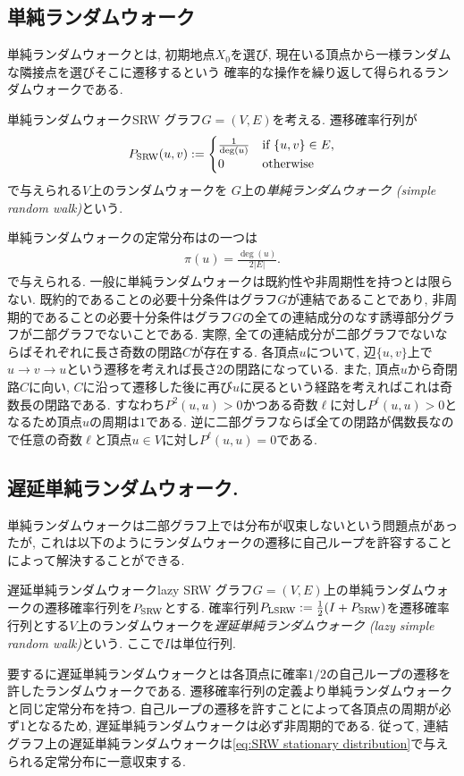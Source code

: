 \subsection{単純ランダムウォーク}
単純ランダムウォークとは, 初期地点$X_0$を選び, 現在いる頂点から一様ランダムな隣接点を選びそこに遷移するという
確率的な操作を繰り返して得られるランダムウォークである.
%
\begin{definition}{単純ランダムウォーク}{SRW}
  グラフ$G=(V,E)$を考える.
  遷移確率行列が
  \[
    P_{\mathrm{SRW}}(u,v) \mathrel{:=} \begin{cases}
      \frac{1}{\deg(u)} & \text{if }\{u,v\}\in E, \\
      0                 & \text{otherwise}
    \end{cases}
  \]
  で与えられる$V$上のランダムウォークを
  $G$上の\emph{単純ランダムウォーク (simple random walk)}という.
\end{definition}
%

単純ランダムウォークの定常分布はの一つは
\begin{align}
  \pi(u) = \frac{\deg(u)}{2|E|}. \label{eq:SRW stationary distribution}
\end{align}
で与えられる.
一般に単純ランダムウォークは既約性や非周期性を持つとは限らない.
既約的であることの必要十分条件はグラフ$G$が連結であることであり,
非周期的であることの必要十分条件はグラフ$G$の全ての連結成分のなす誘導部分グラフが二部グラフでないことである.
実際, 全ての連結成分が二部グラフでないならばそれぞれに長さ奇数の閉路$C$が存在する.
各頂点$u$について, 辺$\{u,v\}$上で$u\to v \to u$という遷移を考えれば長さ$2$の閉路になっている.
また, 頂点$u$から奇閉路$C$に向い, $C$に沿って遷移した後に再び$u$に戻るという経路を考えればこれは奇数長の閉路である.
すなわち$P^2(u,u)>0$かつある奇数$\ell$に対し$P^{\ell}(u,u)>0$となるため頂点$u$の周期は$1$である.
逆に二部グラフならば全ての閉路が偶数長なので任意の奇数$\ell$と頂点$u\in V$に対し$P^\ell(u,u)=0$である.

\subsection{遅延単純ランダムウォーク.}
単純ランダムウォークは二部グラフ上では分布が収束しないという問題点があったが,
これは以下のようにランダムウォークの遷移に自己ループを許容することによって解決することができる.
%
\begin{definition}{遅延単純ランダムウォーク}{lazy SRW}
  グラフ$G=(V,E)$上の単純ランダムウォークの遷移確率行列を$P_{\mathrm{SRW}}$とする.
  確率行列$P_{\mathrm{LSRW}} \mathrel{:=} \frac{1}{2}(I+P_{\mathrm{SRW}})$を遷移確率行列とする$V$上のランダムウォークを\emph{遅延単純ランダムウォーク (lazy simple random walk)}という. ここで$I$は単位行列.
\end{definition}
要するに遅延単純ランダムウォークとは各頂点に確率$1/2$の自己ループの遷移を許したランダムウォークである.
遷移確率行列の定義より単純ランダムウォークと同じ定常分布を持つ.
自己ループの遷移を許すことによって各頂点の周期が必ず$1$となるため, 遅延単純ランダムウォークは必ず非周期的である.
従って, 連結グラフ上の遅延単純ランダムウォークは\cref{eq:SRW stationary distribution}で与えられる定常分布に一意収束する.

